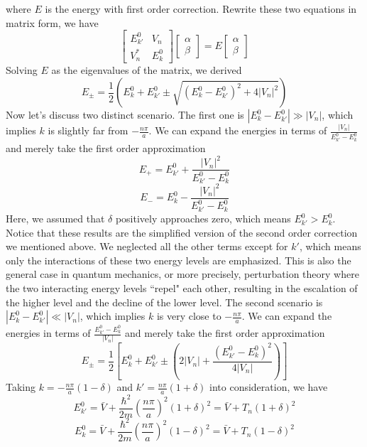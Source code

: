 \documentclass{article}
\begin{document}
where $E$ is the energy with first order correction. Rewrite these two equations in matrix form, we have\begin{equation}
    \begin{bmatrix}
    E_{k'}^0 & V_n \\
    V_n^* & E_k^0
    \end{bmatrix}
    \begin{bmatrix}
    \alpha \\
    \beta
    \end{bmatrix}=E
    \begin{bmatrix}
    \alpha \\
    \beta
    \end{bmatrix}
\end{equation}
Solving $E$ as the eigenvalues of the matrix, we derived\begin{equation}
    E_\pm=\frac12(E_k^0+E_{k'}^0\pm\sqrt{(E_k^0-E_{k'}^0)^2+4|V_n|^2})
\end{equation}
Now let's discuss two distinct scenario. The first one is $|E_k^0-E_{k'}^0|\gg|V_n|$, which implies $k$ is slightly far from $-\frac{n\pi}{a}$. We can expand the energies in terms of $\frac{|V_n|}{E_{k'}^0-E_k^0}$ and merely take the first order approximation\begin{equation}
    E_+=E_{k'}^0+\frac{|V_n|^2}{E_{k'}^0-E_k^0}
\end{equation}\begin{equation}
    E_-=E_k^0-\frac{|V_n|^2}{E_{k'}^0-E_k^0}
\end{equation}
Here, we assumed that $\delta$ positively approaches zero, which means $E_{k'}^0>E_k^0$. Notice that these results are the simplified version of the second order correction we mentioned above. We neglected all the other terms except for $k'$, which means only the interactions of these two energy levels are emphasized. This is also the general case in quantum mechanics, or more precisely, perturbation theory where the two interacting energy levels “repel" each other, resulting in the escalation of the higher level and the decline of the lower level. The second scenario is $|E_k^0-E_{k'}^0|\ll|V_n|$, which implies $k$ is very close to $-\frac{n\pi}{a}$. We can expand the energies in terms of $\frac{E_{k'}^0-E_k^0}{|V_n|}$ and merely take the first order approximation\begin{equation}
    E_\pm=\frac12[E_k^0+E_{k'}^0\pm(2|V_n|+\frac{(E_{k'}^0-E_k^0)^2}{4|V_n|})]
\end{equation}
Taking $k=-\frac{n\pi}{a}(1-\delta)$ and $k'=\frac{n\pi}{a}(1+\delta)$ into consideration, we have\begin{equation}
    E_{k'}^0=\bar{V}+\frac{\hbar^2}{2m}(\frac{n\pi}{a})^2(1+\delta)^2=\bar{V}+T_n(1+\delta)^2
\end{equation}\begin{equation}
    E_k^0=\bar{V}+\frac{\hbar^2}{2m}(\frac{n\pi}{a})^2(1-\delta)^2=\bar{V}+T_n(1-\delta)^2
\end{equation}
\end{document}
